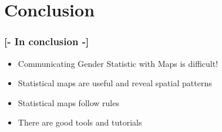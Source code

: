 \documentclass[xcolor=x11names,aspectratio=169, compress]{beamer}
\renewcommand{\(}{\begin{columns}}
\renewcommand{\)}{\end{columns}}
\newcommand{\<}[1]{\begin{column}{#1}}
\renewcommand{\>}{\end{column}}
\begin{document}
%
%

 \section{Conclusion}

\begin{frame}
\frametitle{\textcolor{brique}{[-  \textbf{In conclusion }-]}}
\begin{itemize}[<+-|alert@+>]
    \item Communicating Gender Statistic with Maps is difficult!
    \item Statistical maps are useful and reveal spatial patterns
    \item Statistical maps follow rules
    \item There are good tools and tutorials
\end{itemize}
\end{frame}
\end{document}
